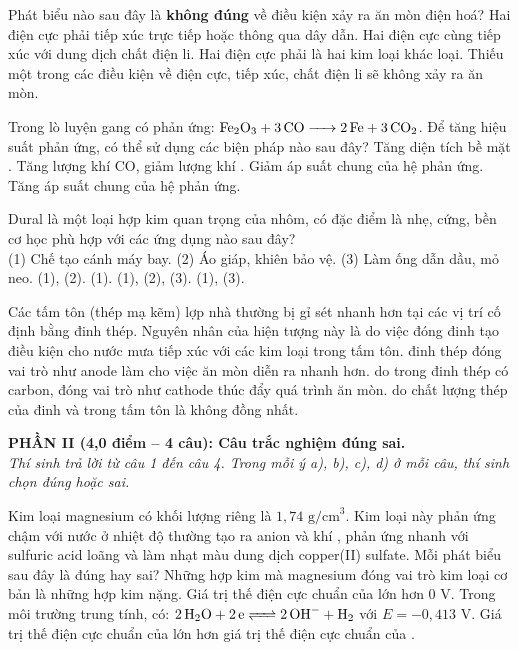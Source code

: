 \documentclass[11pt,a4paper]{article}
\def\loigiai#1{}
\begin{document}
\begin{ex}
Phát biểu nào sau đây là \textbf{không đúng} về điều kiện xảy ra ăn mòn điện hoá?
\choice
{Hai điện cực phải tiếp xúc trực tiếp hoặc thông qua dây dẫn.}
{Hai điện cực cùng tiếp xúc với dung dịch chất điện li.}
{Hai điện cực phải là hai kim loại khác loại.}
{Thiếu một trong các điều kiện về điện cực, tiếp xúc, chất điện li sẽ không xảy ra ăn mòn.}
\loigiai{}
\end{ex}

\begin{ex}
Trong lò luyện gang có phản ứng: $\ce{Fe2O3 + 3CO -> 2Fe + 3CO2}$. Để tăng hiệu suất phản ứng, có thể sử dụng các biện pháp nào sau đây?
\choice
{Tăng diện tích bề mặt .}
{Tăng lượng khí CO, giảm lượng khí .}
{Giảm áp suất chung của hệ phản ứng.}
{Tăng áp suất chung của hệ phản ứng.}
\loigiai{}
\end{ex}

\begin{ex}
Dural là một loại hợp kim quan trọng của nhôm, có đặc điểm là nhẹ, cứng, bền cơ học phù hợp với các ứng dụng nào sau đây?\\
(1) Chế tạo cánh máy bay. \quad (2) Áo giáp, khiên bảo vệ. \quad (3) Làm ống dẫn dầu, mỏ neo.
\choice
{(1), (2).}
{(1).}
{(1), (2), (3).}
{(1), (3).}
\loigiai{}
\end{ex}

\begin{ex}
Các tấm tôn (thép mạ kẽm) lợp nhà thường bị gỉ sét nhanh hơn tại các vị trí cố định bằng đinh thép. Nguyên nhân của hiện tượng này là do
\choice
{việc đóng đinh tạo điều kiện cho nước mưa tiếp xúc với các kim loại trong tấm tôn.}
{đinh thép đóng vai trò như anode làm cho việc ăn mòn diễn ra nhanh hơn.}
{do trong đinh thép có carbon, đóng vai trò như cathode thúc đẩy quá trình ăn mòn.}
{do chất lượng thép của đinh và trong tấm tôn là không đồng nhất.}
\loigiai{}
\end{ex}

\newpage

\noindent
\textbf{PHẦN II (4,0 điểm -- 4 câu): Câu trắc nghiệm đúng sai.}\\
\textit{Thí sinh trả lời từ câu 1 đến câu 4. Trong mỗi ý a), b), c), d) ở mỗi câu, thí sinh chọn đúng hoặc sai.}

\setcounter{ex}{0}

\begin{ex}
Kim loại magnesium có khối lượng riêng là $1{,}74\text{ g/cm}^3$. Kim loại này phản ứng chậm với nước ở nhiệt độ thường tạo ra anion  và khí , phản ứng nhanh với sulfuric acid loãng và làm nhạt màu dung dịch copper(II) sulfate. Mỗi phát biểu sau đây là đúng hay sai?
\choiceTF
{Những hợp kim mà magnesium đóng vai trò kim loại cơ bản là những hợp kim nặng.}
{Giá trị thế điện cực chuẩn của  lớn hơn 0 V.}
{Trong môi trường trung tính, có: $\ce{2H2O + 2e <=> 2OH- + H2}$ với $E = -0{,}413\text{ V}$.}
{Giá trị thế điện cực chuẩn của  lớn hơn giá trị thế điện cực chuẩn của .}
\loigiai{}
\end{ex}
\end{document}
